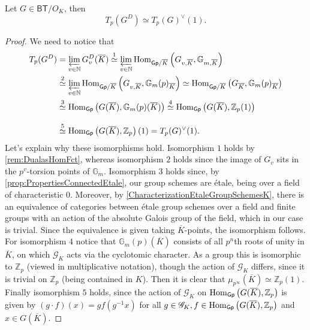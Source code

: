 \begin{prop}[]\label{TateModuleDuals}
	Let $G \in \mathsf{BT}/O_K$, then
	\begin{equation*}
		T_p(G^D) \simeq T_p(G)^\vee(1)
	.\end{equation*}
\end{prop}
\begin{proof}
	We need to notice that
	\begin{align*}
		T_p(G^D) &= \varprojlim_{v \in \mathbb{N}} G_v^D(\overline{K})
		\stackrel{1}{\simeq} \varprojlim_{v \in \mathbb{N}}
		\Hom_{ \mathsf{Gp}/\overline{K} }
		\left( G_{  v,\overline{K}}, \mathbb{G}_{ m,\overline{K}} \right) \\
		&\stackrel{2}{\simeq} \varprojlim_{v \in \mathbb{N}}
		\Hom_{ \mathsf{Gp}/\overline{K} }
		\left( G_{ v,\overline{K}}, {\mathbb{G}_m(p)}_{\overline{K}}\right)
		\simeq \Hom_{ \mathsf{Gp}/\overline{K} }
		\left( {G}_{\overline{K}}, {\mathbb{G}_m(p)}_{\overline{K}} \right)\\
		&\stackrel{3}{\simeq} \Hom_{ \mathsf{Gp} } 
		\left( G(\overline{K}), \mathbb{G}_m(p)(\overline{K}) \right)
		\stackrel{4}{\simeq} \Hom_{ \mathsf{Gp} } 
		\left( G(\overline{K}), \mathbb{Z}_{p}(1) \right) 
		\phantom{\varprojlim_{v \in \mathbb{N}}}\\
		&\stackrel{5}{\simeq} \Hom_{ \mathsf{Gp} } 
		\left( G(\overline{K}), \mathbb{Z}_{p} \right)(1)
		= T_p(G)^\vee(1)
	.\end{align*}
	Let's explain why these isomorphisms hold.
	Isomorphism $1$ holds by \cref{rem:DualasHomFct}, whereas isomorphism $2$
	holds since the image of $G_v$ sits in the $p^v$-torsion points of $\mathbb{G}_m$.
	Isomorphism $3$ holds since, by \cref{prop:PropertiesConnectedEtale}, our group
	schemes are étale, being over a field of characteristic $0$.
	Moreover, by \cref{CharacterizationEtaleGroupSchemesK}, there is an equivalence of categories
	between étale group schemes over a field and finite groups with an action
	of the absolute Galois group of the field, which in our case is trivial.
	Since the equivalence is given taking $\overline{K}$-points, the isomorphism follows.
	For isomorphism $4$ notice that $\mathbb{G}_m(p)(\overline{K})$ consists of all
	$p^n$th roots of unity in $\overline{K}$, on which $\mathscr{G}_K$ acts via the cyclotomic character.
	As a group this is isomorphic to $\mathbb{Z}_{p}$ (viewed in multiplicative notation),
	though the action of $\mathscr{G}_K$ differs, since
	it is trivial on $\mathbb{Z}_{p}$ (being contained in $K$).
	Then it is clear that $\mu_{p^\infty}(\overline{K}) \simeq \mathbb{Z}_{p}(1)$.
	Finally isomorphism $5$ holds, since the action of $\mathscr{G}_K$ on 
	$\operatorname{Hom}_{ \mathsf{Gp} } \left( G(\overline{K}), \mathbb{Z}_{p} \right)$
	is given by $(g \cdot f)(x) = gf(g^{-1}x)$ for all $g \in \mathscr{G}_K, 
	f \in \operatorname{Hom}_{\mathsf{Gp}} \left( G(\overline{K}), \mathbb{Z}_{p} \right)$
	and $x \in G(\overline{K})$.
\end{proof}
